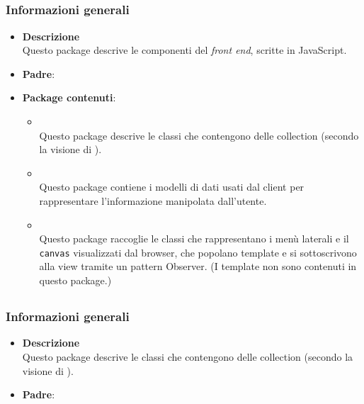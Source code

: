


\subsection{}
\label{\nogloxy{swedesigner::client}}
\subsubsection{Informazioni generali}
\begin{itemize}
\item \textbf{Descrizione}\\
Questo package descrive le componenti del \emph{front end}, scritte in JavaScript.
\item \textbf{Padre}: \hyperref[\nogloxy{swedesigner}]{}
\item \textbf{Package contenuti}:
\begin{itemize}
\item \hyperref[\nogloxy{swedesigner::client::collection}]{}\\
Questo package descrive le classi che contengono delle collection (secondo la visione di \backbonejs). 
\item \hyperref[\nogloxy{swedesigner::client::model}]{}\\
Questo package contiene i modelli di dati usati dal client per rappresentare l'informazione manipolata dall'utente.
\item \hyperref[\nogloxy{swedesigner::client::view}]{}\\
Questo package raccoglie le classi che rappresentano i menù laterali e il \texttt{canvas} visualizzati dal browser, che popolano template e si sottoscrivono alla view tramite un pattern Observer. (I template non sono contenuti in questo package.)
\end{itemize}
\end{itemize}

\subsection{}
\label{\nogloxy{swedesigner::client::collection}}
\subsubsection{Informazioni generali}
\begin{itemize}
\item \textbf{Descrizione}\\
Questo package descrive le classi che contengono delle collection (secondo la visione di \backbonejs).
\item \textbf{Padre}: \hyperref[\nogloxy{swedesigner::client}]{}
\end{itemize}

